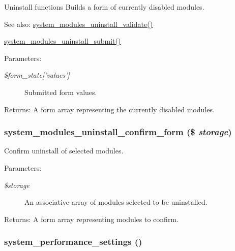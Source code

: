 Uninstall functions Builds a form of currently disabled modules.

\begin{Desc}
\item[See also:]\hyperlink{system_8admin_8inc_043bb0ba8fa3b299202ffee8d63e9fca}{system\_\-modules\_\-uninstall\_\-validate()} 

\hyperlink{system_8admin_8inc_a4fa94b5401ff21e77b711edf0e196c4}{system\_\-modules\_\-uninstall\_\-submit()} \end{Desc}
\begin{Desc}
\item[Parameters:]
\begin{description}
\item[{\em \$form\_\-state\mbox{[}'values'\mbox{]}}]Submitted form values. \end{description}
\end{Desc}
\begin{Desc}
\item[Returns:]A form array representing the currently disabled modules. \end{Desc}
\hypertarget{group__forms_g3006c568c437410b5fedb4c6d68ddbf4}{
\subsubsection[{system\_\-modules\_\-uninstall\_\-confirm\_\-form}]{\setlength{\rightskip}{0pt plus 5cm}system\_\-modules\_\-uninstall\_\-confirm\_\-form (\$ {\em storage})}}
\label{group__forms_g3006c568c437410b5fedb4c6d68ddbf4}


Confirm uninstall of selected modules.

\begin{Desc}
\item[Parameters:]
\begin{description}
\item[{\em \$storage}]An associative array of modules selected to be uninstalled. \end{description}
\end{Desc}
\begin{Desc}
\item[Returns:]A form array representing modules to confirm. \end{Desc}
\hypertarget{group__forms_g47b1f34bfff2f44fd22cfc866bff59d7}{
\subsubsection[{system\_\-performance\_\-settings}]{\setlength{\rightskip}{0pt plus 5cm}system\_\-performance\_\-settings ()}}
\label{group__forms_g47b1f34bfff2f44fd22cfc866bff59d7}


